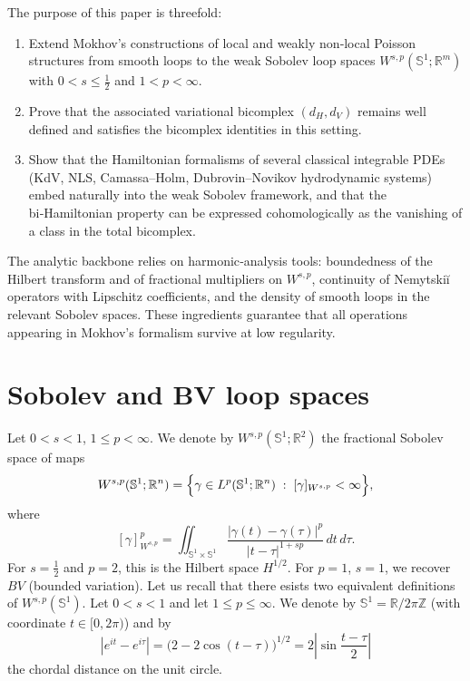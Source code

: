 \documentclass{amsart}
\newcounter{ex}
\newcounter{re}
\begin{document}
The purpose of this paper is threefold:

\begin{enumerate}[label=\arabic*)]
  \item Extend Mokhov’s constructions of local and weakly non‑local Poisson structures from smooth loops to the weak Sobolev loop spaces
        \(
        W^{s,p}(\mathbb S^{1};\mathbb R^{m})
        \)
        with \(0<s\le\tfrac12\) and \(1<p<\infty\).
  \item Prove that the associated variational bicomplex \((d_{H},d_{V})\) remains well defined and satisfies the bicomplex identities in this setting.
  \item Show that the Hamiltonian formalisms of several classical integrable PDEs (KdV, NLS, Camassa–Holm, Dubrovin–Novikov hydrodynamic systems) embed naturally into the weak Sobolev framework, and that the bi‑Hamiltonian property can be expressed cohomologically as the vanishing of a class in the total bicomplex.
\end{enumerate}

The analytic backbone relies on harmonic‑analysis tools: boundedness of the Hilbert transform and of fractional multipliers on \(W^{s,p}\), continuity of Nemytskiĭ operators with Lipschitz coefficients, and the density of smooth loops in the relevant Sobolev spaces.  These ingredients guarantee that all operations appearing in Mokhov’s formalism survive at low regularity.
\section{Sobolev and BV loop spaces}

Let $0<s<1$, $1\leq p<\infty$. We denote by $W^{s,p}(\mathbb S^1;\mathbb R^2)$ the fractional Sobolev space of maps
\[
W^{s,p}(\mathbb S^1;\mathbb R^n)
=\Bigl\{ \gamma\in L^p(\mathbb S^1;\mathbb R^n)\;:\;
[\gamma]_{W^{s,p}}<\infty \Bigr\},
\]
where
\[
[\gamma]_{W^{s,p}}^p
=\iint_{\mathbb S^1\times\mathbb S^1}\frac{|\gamma(t)-\gamma(\tau)|^p}{|t-\tau|^{1+sp}}\,dt\,d\tau.
\]
For $s=\tfrac12$ and $p=2$, this is the Hilbert space $H^{1/2}$. For $p=1$, $s=1$, we recover $BV$ (bounded variation).
Let us recall that there esists two equivalent definitions of $W^{s,p}(\mathbb S^1).$
Let $0<s<1$ and let $1\le p\le\infty$. We denote by $\mathbb S^1=\mathbb R/2\pi\mathbb Z$
(with coordinate $t\in[0,2\pi)$) and by
\[
|e^{it}-e^{i\tau}| = \big(2-2\cos(t-\tau)\big)^{1/2} = 2\left|\sin\frac{t-\tau}{2}\right|
\]
the chordal distance on the unit circle.
\end{document}
